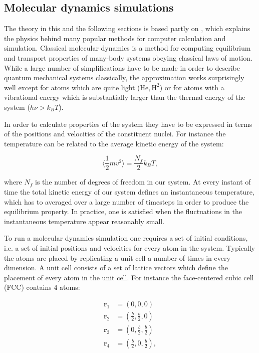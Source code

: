 \subsection{Molecular dynamics simulations}
The theory in this and the following sections
is based partly on \parencite[Frenkel, Daan
and Smit, Berend][pages 63-107]{frenkel2001understanding},
which explains the physics behind many popular methods 
for computer calculation and simulation.
Classical molecular dynamics is a method
for computing equilibrium and transport properties
of many-body systems obeying classical laws of motion.
While a large number of simplifications have to be made
in order to describe quantum mechanical systems classically,
the approximation works surprisingly well
except for atoms which are quite light ($\text{He}, \text{H}^2$)
or for atoms with a vibrational energy
which is substantially larger than the thermal energy
of the system ($h\nu > k_B T$).
\par
In order to calculate properties of the system
they have to be expressed in terms of the positions
and velocities of the constituent nuclei.
For instance the temperature can be related
to the average kinetic energy of the system:

\begin{equation}
 \langle \frac{1}{2} m v^2 \rangle = \frac{N_f}{2} k_B T , 
\end{equation}

where $N_f$ is the number of degrees of freedom in our system.
At every instant of time the total kinetic energy
of our system defines an instantaneous temperature,
which has to averaged over a large number of timesteps
in order to produce the equilibrium property.
In practice, one is satisfied when the fluctuations
in the instantaneous temperature appear reasonably small.
\par
To run a molecular dynamics simulation one requires
a set of initial conditions, i.e. a set of initial positions and velocities
for every atom in the system. Typically the atoms
are placed by replicating a unit cell a number of times
in every dimension. A unit cell consists of a set
of lattice vectors which define the placement of every atom in the
unit cell. For instance the face-centered cubic cell (FCC)
contains 4 atoms:

\begin{equation}
    \begin{split}
        \bm{r}_1 &= (0, 0, 0) \\
        \bm{r}_2 &= (\frac{b}{2}, \frac{b}{2}, 0) \\
        \bm{r}_3 &= (0, \frac{b}{2}, \frac{b}{2}) \\
        \bm{r}_4 &= (\frac{b}{2}, 0, \frac{b}{2}) , \\
    \end{split}
\end{equation}

